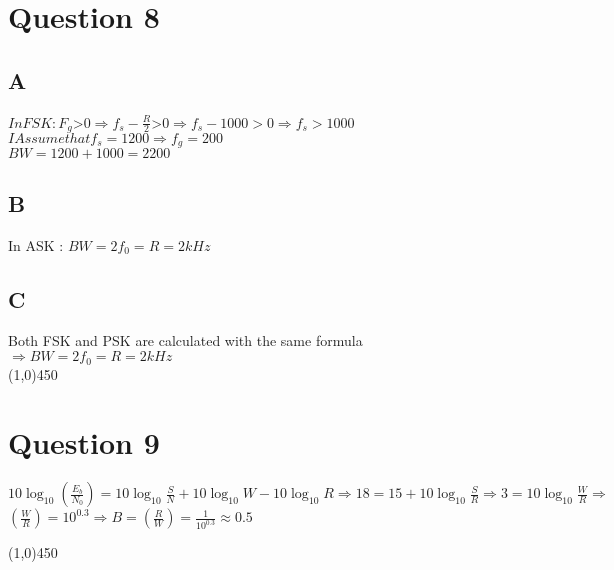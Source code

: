\documentclass[a4paper,12pt]{article}
\begin{document}

\section {Question 8 }

\subsection{A}
\begin{doublespace}
$In FSK : F_g $>$  0 \Longrightarrow f_s - \frac{R}{2}  $>$  0 \Longrightarrow  f_s - 1000 > 0 \Longrightarrow f_s > 1000 $ \\
$I Assume that f_s = 1200 \Longrightarrow f_g = 200$ \\
$BW = 1200 + 1000 = 2200$\\
\end{doublespace}



\subsection{B}
In ASK : $BW = 2f_0 = R = 2 kHz$ \\


\subsection{C}
Both FSK and PSK are calculated with the same formula $\Longrightarrow BW = 2f_0 = R = 2 kHz $\\
\line(1,0){450}
\section {Question 9 }
\begin{doublespace}
$10 \log_{10}{(\frac{E_b}{N_0})} = 10 \log_{10}{\frac{S}{N}} + 10 \log_{10}{W} - 10 \log_{10}{R} \Longrightarrow 18 = 15 + 10 \log_{10}{\frac{S}{R}} \Longrightarrow 3 = 10 \log_{10}{\frac{W}{R}} \Longrightarrow$\\
$ (\frac{W}{R}) = 10^{0.3} \Longrightarrow B = (\frac{R}{W}) = \frac{1}{10^{0.3}} \approx 0.5$
\end{doublespace}
\line(1,0){450}

\end{document}
